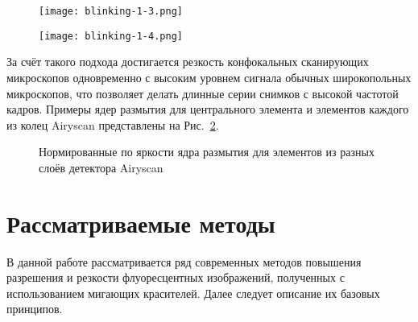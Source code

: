 \begin{figure}[ht]
	\centering
	\hfill
	\begin{minipage}{0.45\textwidth}
		\centering
		\texttt{[image: blinking-1-3.png]}
		\label{fig:blinking-airyscan}
	\end{minipage} \hfill
	\begin{minipage}{0.45\textwidth}
		\centering
		\texttt{[image: blinking-1-4.png]}
		\label{fig:blinking-psf-comparison}
	\end{minipage}
	\hfill
\end{figure}

За счёт такого подхода достигается резкость конфокальных сканирующих микроскопов одновременно с высоким уровнем сигнала обычных широкопольных микроскопов, что позволяет делать длинные серии снимков с высокой частотой кадров. Примеры ядер размытия для центрального элемента и элементов каждого из колец Airyscan представлены на Рис.~\ref{fig:blinking-airyscan-psf-samples}.

\begin{figure}[ht]
	\caption{Нормированные по яркости ядра размытия для элементов из разных слоёв детектора Airyscan}
	\label{fig:blinking-airyscan-psf-samples}
\end{figure}

\section{Рассматриваемые методы}

В данной работе рассматривается ряд современных методов повышения разрешения и резкости флуоресцентных изображений, полученных с использованием мигающих красителей. Далее следует описание их базовых принципов.

